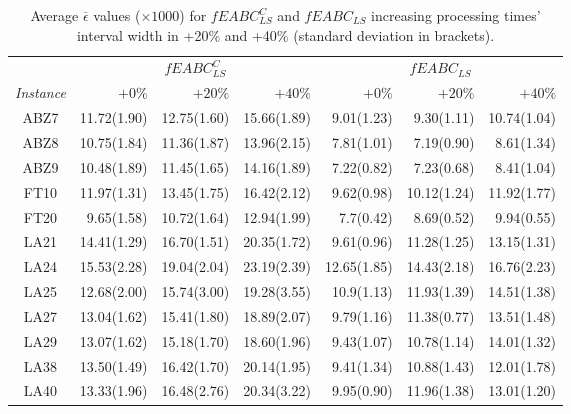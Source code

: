 \documentclass[sn-mathphys]{sn-jnl}%
\theoremstyle{thmstyleone}%
\theoremstyle{thmstyletwo}%
\theoremstyle{thmstylethree}%
\begin{document}
\begin{table}[htb]
\small
\centering
\setlength{\tabcolsep}{1.5mm}%
\caption{Average $\overline{\epsilon}$ values ($\times 1000$) for $fEABC_{LS}^C$ and $fEABC_{LS}$ increasing processing times' interval width in +20\% and +40\% (standard deviation in brackets).}
\label{table:expResRobInc}
\begin{tabular}{crrrrrr}
\toprule
 & \multicolumn{3}{c}{$fEABC_{LS}^C$}& \multicolumn{3}{c}{$fEABC_{LS}$} \\
 \cmidrule(lr){2-4}\cmidrule(lr){5-7}
\textit{Instance}  & $+0\%$ & $+20\%$ & $+40\%$ & $+0\%$ & $+20\%$ & $+40\%$ \\
\midrule
ABZ7&11.72\tiny{(1.90)}&12.75\tiny{(1.60)}&15.66\tiny{(1.89)}&9.01\tiny{(1.23)}&9.30\tiny{(1.11)}&10.74\tiny{(1.04)}\\
ABZ8&10.75\tiny{(1.84)}&11.36\tiny{(1.87)}&13.96\tiny{(2.15)}&7.81\tiny{(1.01)}&7.19\tiny{(0.90)}&8.61\tiny{(1.34)}\\
ABZ9&10.48\tiny{(1.89)}&11.45\tiny{(1.65)}&14.16\tiny{(1.89)}&7.22\tiny{(0.82)}&7.23\tiny{(0.68)}&8.41\tiny{(1.04)}\\
FT10&11.97\tiny{(1.31)}&13.45\tiny{(1.75)}&16.42\tiny{(2.12)}&9.62\tiny{(0.98)}&10.12\tiny{(1.24)}&11.92\tiny{(1.77)}\\
FT20&9.65\tiny{(1.58)}&10.72\tiny{(1.64)}&12.94\tiny{(1.99)}&7.7\tiny{(0.42)}&8.69\tiny{(0.52)}&9.94\tiny{(0.55)}\\
LA21&14.41\tiny{(1.29)}&16.70\tiny{(1.51)}&20.35\tiny{(1.72)}&9.61\tiny{(0.96)}&11.28\tiny{(1.25)}&13.15\tiny{(1.31)}\\
LA24&15.53\tiny{(2.28)}&19.04\tiny{(2.04)}&23.19\tiny{(2.39)}&12.65\tiny{(1.85)}&14.43\tiny{(2.18)}&16.76\tiny{(2.23)}\\
LA25&12.68\tiny{(2.00)}&15.74\tiny{(3.00)}&19.28\tiny{(3.55)}&10.9\tiny{(1.13)}&11.93\tiny{(1.39)}&14.51\tiny{(1.38)}\\
LA27&13.04\tiny{(1.62)}&15.41\tiny{(1.80)}&18.89\tiny{(2.07)}&9.79\tiny{(1.16)}&11.38\tiny{(0.77)}&13.51\tiny{(1.48)}\\
LA29&13.07\tiny{(1.62)}&15.18\tiny{(1.70)}&18.60\tiny{(1.96)}&9.43\tiny{(1.07)}&10.78\tiny{(1.14)}&14.01\tiny{(1.32)}\\
LA38&13.50\tiny{(1.49)}&16.42\tiny{(1.70)}&20.14\tiny{(1.95)}&9.41\tiny{(1.34)}&10.88\tiny{(1.43)}&12.01\tiny{(1.78)}\\
LA40&13.33\tiny{(1.96)}&16.48\tiny{(2.76)}&20.34\tiny{(3.22)}&9.95\tiny{(0.90)}&11.96\tiny{(1.38)}&13.01\tiny{(1.20)}\\

\bottomrule
\end{tabular}
\end{table}
\end{document}
